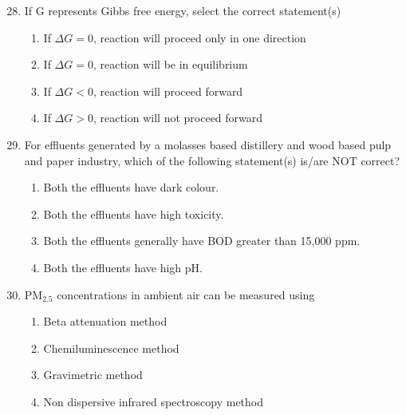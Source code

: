 \documentclass[12pt,a4paper]{article}
\begin{document}
\begin{enumerate}
   \setcounter{enumi}{27}
   \item If G represents Gibbs free energy, select the correct statement(s)
         \begin{enumerate}
            \item If $\Delta G = 0$, reaction will proceed only in one direction
            \item If $\Delta G = 0$, reaction will be in equilibrium
            \item If $\Delta G < 0$, reaction will proceed forward
            \item If $\Delta G > 0$, reaction will not proceed forward
         \end{enumerate}

   \item For effluents generated by a molasses based distillery and wood based pulp and paper industry, which of the following statement(s) is/are NOT correct?
         \begin{enumerate}
            \item Both the effluents have dark colour.
            \item Both the effluents have high toxicity.
            \item Both the effluents generally have BOD greater than 15,000 ppm.
            \item Both the effluents have high pH.
         \end{enumerate}

   \item PM$_{2.5}$ concentrations in ambient air can be measured using
         \begin{enumerate}
            \item Beta attenuation method
            \item Chemiluminescence method
            \item Gravimetric method
            \item Non dispersive infrared spectroscopy method
         \end{enumerate}


\end{enumerate}
\end{document}
